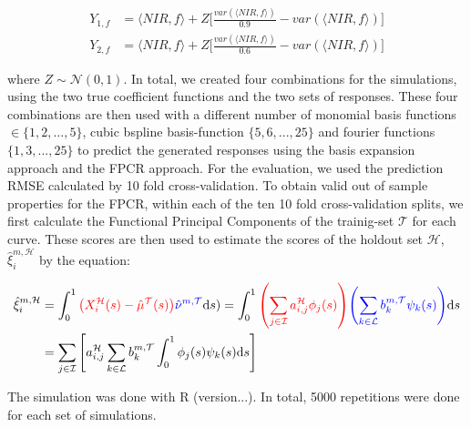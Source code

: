 \documentclass[11pt,twoside,a4paper]{article}
\begin{document}
		\begin{equation}
			\begin{split}
				Y_{1,f} & = \langle NIR, f\rangle + Z  \biggl\lbrack\frac{var(\langle NIR, f\rangle)}{0.9} - var(\langle NIR, f\rangle)\biggr\rbrack \\
				Y_{2,f} & = \langle NIR, f\rangle + Z  \biggl\lbrack\frac{var(\langle NIR, f\rangle)}{0.6} - var(\langle NIR, f\rangle)\biggr\rbrack
			\end{split}
		\end{equation}
		
		where $Z \sim \mathcal{N}(0,1)$. In total, we created four combinations for the simulations, using the two true coefficient functions and the two sets of responses. These four combinations are then used with a different number of monomial basis functions $ \in \{1,2, \dots, 5\}$, cubic bspline basis-function $\{5,6,...,25\}$ and fourier functions $\{1,3,...,25\}$ to predict the generated responses using the basis expansion approach and the FPCR approach. For the evaluation, we used the prediction RMSE calculated by 10 fold cross-validation.
		 To obtain valid out of sample properties for the FPCR, within each of the ten 10 fold cross-validation splits, we first calculate the Functional Principal Components of the trainig-set $\mathcal{T}$ for each curve. These scores are then used to estimate the scores of the holdout set $\mathcal{H}$, $\hat{\xi}_{i}^{m, \mathcal{H}}$  by the equation:
		 
	\begin{equation}
		\begin{split}
			\hat{\xi}_{i}^{m, \mathcal{H}} &=  \int_{0}^{1} {\color{red} \left(X_{i}^{\mathcal{H}}(s) - \hat{\mu}^{\mathcal{T}}(s)\right)} {\color{blue}\hat{\nu}^{m, \mathcal{T}} }\mathrm{d}s) 
						    = \int_{0}^{1} {\color{red}\left(\sum_{j \in \mathcal{I}} a_{i,j}^{\mathcal{H}} \phi_j(s)\right)} {\color{blue}\left(\sum_{k \in \mathcal{L}} b_{k}^{m, \mathcal{T}} \psi_{k}(s)\right)} \mathrm{d}s \\
			 &= \sum_{j \in \mathcal{I}} \left[ a_{i,j}^{\mathcal{H}}\sum_{k \in \mathcal{L}}  b_{k}^{m, \mathcal{T}} \int_{0}^{1} \phi_j(s) \psi_{k}(s)\mathrm{d}s\right]
		\end{split}
	\end{equation}
	
	
	
		 The simulation was done with R (version...). In total, 5000 repetitions were done for each set of simulations. 
		
	
\end{document}
